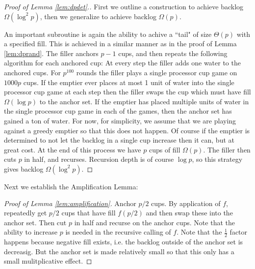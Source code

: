 \documentclass{article}[11pt]
\begin{document}
\begin{proof}[Proof of Lemma \ref{lem:dpdet}.]
  First we outline a construction to achieve backlog $\Omega(\log^2 p)$, then we generalize to achieve backlog $\Omega(p)$.

  An important subroutine is again the ability to achive a ``tail" of size
  $\Theta(p)$ with a specified fill.  This is achieved in a similar manner as
  in the proof of Lemma \ref{lem:dprand}.  The filler anchors $p-1$ cups, and
  then repeats the following algorithm for each anchored cup: At every step the
  filler adds one water to the anchored cups. For $p^{100}$ rounds the filler
  plays a single processor cup game on $1000p$ cups. If the emptier ever places
  at most 1 unit of water into the single processor cup game at each step then
  the filler swaps the cup which must have fill $\Omega(\log p)$ to the anchor
  set.  If the emptier has placed multiple units of water in the single
  processor cup game in each of the games, then the anchor set has gained a ton
  of water. For now, for simplicity, we assume that we are playing against a
  greedy emptier so that this does not happen. Of course if the emptier is
  determined to not let the backlog in a single cup increase then it can, but
  at great cost.  At the end of this process we have $p$ cups of fill
  $\Omega(p)$.  The filler then cuts $p$ in half, and recurses.
  Recursion depth is of course $\log p$, so this strategy gives backlog
  $\Omega(\log^2 p)$.

\end{proof}

Next we establish the Amplification Lemma:
\begin{proof}[Proof of Lemma \ref{lem:amplification}]
  Anchor $p/2$ cups. By application of $f$, repeatedly get $p/2$ cups that have fill $f(p/2)$ and then swap these into the anchor set. 
  Then cut $p$ in half and recurse on the anchor cups.
  Note that the ability to increase $p$ is needed in the recursive calling of $f$.
  Note that the $\frac{1}{2}$ factor happens because negative fill exists, i.e. the
  backlog outside of the anchor set is decreasig. But the anchor set is made
  relatively small so that this only has a small mulitplicative effect.
\end{proof}
\end{document}

